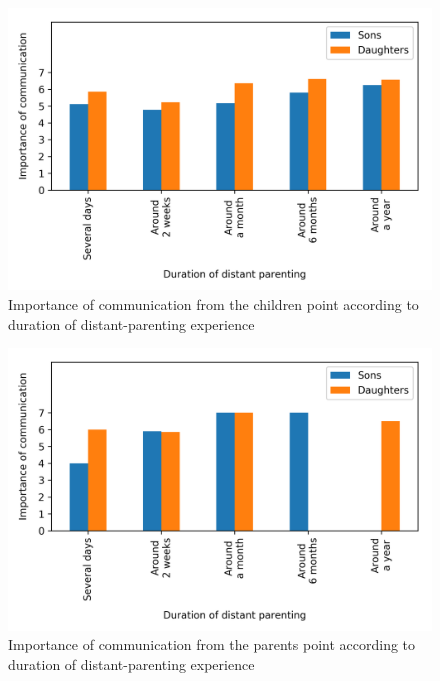 \begin{figure}[h]
    \centering
    \caption{Importance of communication from the children point according to duration of distant-parenting experience}
    \label{fig:plot_7}
    \includegraphics[scale=0.58]{plots/plot_7.png}
\end{figure}

\begin{figure}[h]
    \centering
    \caption{Importance of communication from the parents point according to duration of distant-parenting experience}
    \label{fig:plot_6}
    \includegraphics[scale=0.58]{plots/plot_6.png}
\end{figure}
    
